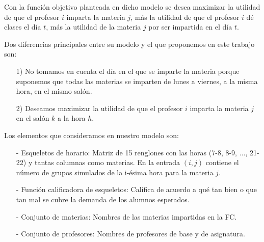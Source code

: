 Con la función objetivo planteada en dicho modelo se desea maximizar la utilidad de que el profesor $i$ imparta la materia $j$, más la utilidad de que el profesor $i$ dé clases el día $t$, más la utilidad de la materia $j$ por ser impartida en el día $t$.

Dos diferencias principales entre su modelo y el que proponemos en este trabajo son:

\begin{enumerate}
\item[1)] No tomamos en cuenta el día en el que se imparte la materia porque suponemos que todas las materias se imparten de lunes a viernes, a la misma hora, en el mismo salón.

\item[2)] Deseamos maximizar la utilidad de que el profesor $i$ imparta la materia $j$ en el salón $k$ a la hora $h$.
\end{enumerate}


Los elementos que consideramos en nuestro modelo son:

\begin{itemize}
\item[-] Esqueletos de horario: Matriz de 15 renglones con las horas (7-8, 8-9, $\ldots$, 21-22) y tantas columnas como materias. En la entrada $(i,j)$ contiene el número de grupos simulados de la i-ésima hora para la materia $j$.

\item[-] Función calificadora de esqueletos: Califica de acuerdo a qué tan bien o que tan mal se cubre la demanda de los alumnos esperados.

\item[-] Conjunto de materias: Nombres de las materias impartidas en la FC.

\item[-] Conjunto de profesores: Nombres de profesores de base y de asignatura.
\end{itemize}

